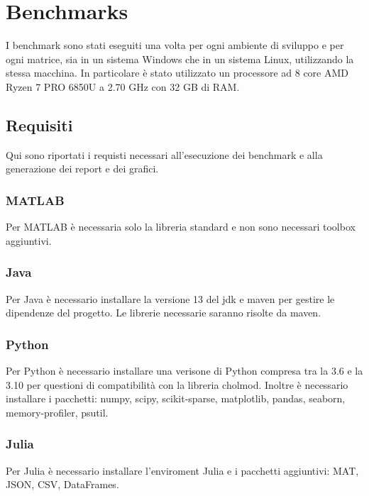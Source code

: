 \documentclass[a4paper, 12pt]{article}
\begin{document}
    \section{Benchmarks}
        I benchmark sono stati eseguiti una volta per ogni ambiente di sviluppo e per ogni matrice, sia in un sistema
        Windows che in un sistema Linux, utilizzando la stessa macchina.
        In particolare è stato utilizzato un processore ad 8 core AMD Ryzen 7 PRO 6850U a 2.70 GHz con 32 GB di RAM.

        \subsection{Requisiti}

            Qui sono riportati i requisti necessari all'esecuzione dei benchmark
            e alla generazione dei report e dei grafici.

            \subsubsection{MATLAB}
                Per MATLAB è necessaria solo la libreria standard e non sono
                necessari toolbox aggiuntivi.
            \subsubsection{Java}
                Per Java è necessario installare la versione 13 del jdk e maven
                per gestire le dipendenze del progetto. Le librerie necessarie
                saranno risolte da maven.
            \subsubsection{Python}
                Per Python è necessario installare una verisone di Python 
                compresa tra la 3.6 e la 3.10 per questioni di compatibilità
                con la libreria cholmod. Inoltre è necessario installare i
                pacchetti: numpy, scipy, scikit-sparse, matplotlib, pandas,
                seaborn, memory-profiler, psutil.
            \subsubsection{Julia}
                Per Julia è necessario installare l'enviroment Julia e i 
                pacchetti aggiuntivi: MAT, JSON, CSV, DataFrames.
\end{document}
